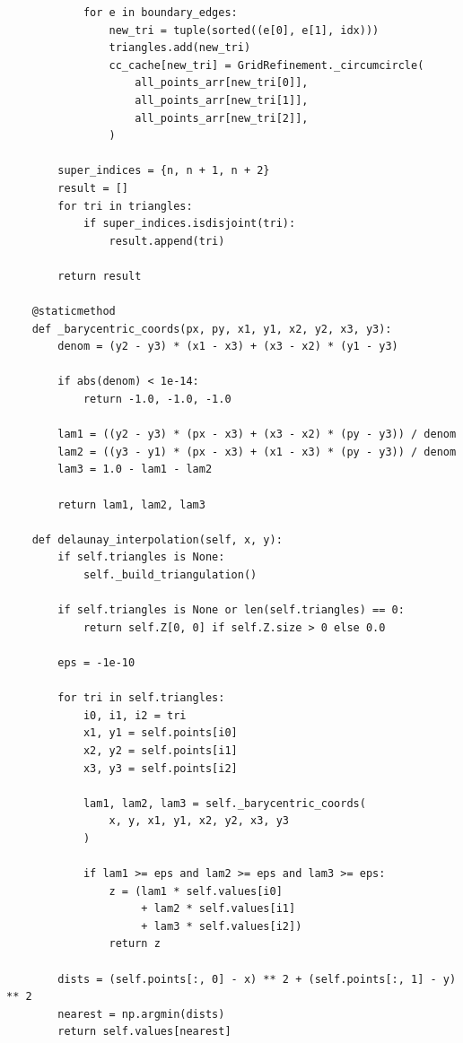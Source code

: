 \documentclass[a4paper, 14pt]{extarticle}
\begin{document}
\begin{longlisting}
\begin{verbatim}
            for e in boundary_edges:
                new_tri = tuple(sorted((e[0], e[1], idx)))
                triangles.add(new_tri)
                cc_cache[new_tri] = GridRefinement._circumcircle(
                    all_points_arr[new_tri[0]],
                    all_points_arr[new_tri[1]],
                    all_points_arr[new_tri[2]],
                )

        super_indices = {n, n + 1, n + 2}
        result = []
        for tri in triangles:
            if super_indices.isdisjoint(tri):
                result.append(tri)

        return result

    @staticmethod
    def _barycentric_coords(px, py, x1, y1, x2, y2, x3, y3):
        denom = (y2 - y3) * (x1 - x3) + (x3 - x2) * (y1 - y3)

        if abs(denom) < 1e-14:
            return -1.0, -1.0, -1.0

        lam1 = ((y2 - y3) * (px - x3) + (x3 - x2) * (py - y3)) / denom
        lam2 = ((y3 - y1) * (px - x3) + (x1 - x3) * (py - y3)) / denom
        lam3 = 1.0 - lam1 - lam2

        return lam1, lam2, lam3

    def delaunay_interpolation(self, x, y):
        if self.triangles is None:
            self._build_triangulation()

        if self.triangles is None or len(self.triangles) == 0:
            return self.Z[0, 0] if self.Z.size > 0 else 0.0

        eps = -1e-10

        for tri in self.triangles:
            i0, i1, i2 = tri
            x1, y1 = self.points[i0]
            x2, y2 = self.points[i1]
            x3, y3 = self.points[i2]

            lam1, lam2, lam3 = self._barycentric_coords(
                x, y, x1, y1, x2, y2, x3, y3
            )

            if lam1 >= eps and lam2 >= eps and lam3 >= eps:
                z = (lam1 * self.values[i0]
                     + lam2 * self.values[i1]
                     + lam3 * self.values[i2])
                return z

        dists = (self.points[:, 0] - x) ** 2 + (self.points[:, 1] - y) ** 2
        nearest = np.argmin(dists)
        return self.values[nearest]
\end{verbatim}
\end{longlisting}
\end{document}
